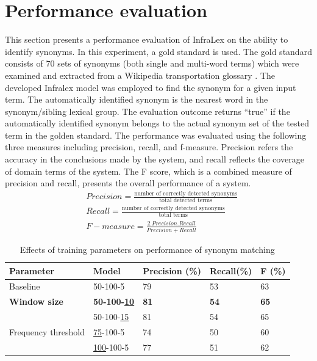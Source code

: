 \documentclass[Journal,InsideFigs, DoubleSpace]{ascelike} %
\begin{document}
{\section{Performance evaluation} \label{sec:eval_infralex}
This section presents a performance evaluation of InfraLex on the ability to identify synonyms. In this experiment, a gold standard  is used. The gold standard consists of 70 sets of synonyms (both single and multi-word terms) which were examined and extracted from a Wikipedia transportation glossary \cite{wikipedia16}. The developed Infralex model was employed to find the synonym for a given input term. The automatically identified synonym is the nearest word in the synonym/sibling lexical group. The evaluation outcome returns ``true'' if the automatically identified synonym belongs to the actual synonym set of the tested term in the golden standard. The performance was evaluated using the following three measures including precision, recall, and f-measure. Precision refers the accuracy in the conclusions made by the system, and recall reflects the coverage of domain terms of the system. The F score, which is a combined measure of precision and recall, presents the overall performance of a system. 
%
\begin{align} 
&Precision = \frac{\text{number of correctly detected synonyms}}{\text{total detected terms}}  \\
&Recall = \frac{\text{number of correctly detected synonyms}}{\text{total terms}}  \\ 
&F-measure = \frac{2.Precision.Recall}{Precision+Recall}
\end{align}
\begin{table} [b] 
	\caption{Effects of training parameters on performance of synonym matching}
	\label{table:eval_syn_par_effect}
	\centering
	\small
	\renewcommand{\arraystretch}{1.25}
	\begin{tabular}{l l l l l }
		\hline
		\hline
		\textbf{Parameter} & \textbf{Model} & \textbf{Precision (\%)}  & \textbf{Recall(\%)} & \textbf{F (\%)}\\
		\hline
		Baseline	&	50-100-5	&79		&53		&63\\
		\hline
		\textbf{Window size}	&\textbf{50-100-\underline{10}}	&\textbf{81}		&\textbf{54}		&\textbf{65}\\
		&50-100-\underline{15}	&81		&54		&65\\
		\hline		
		Frequency threshold	&\underline{75}-100-5	&74		&50		&60\\
		&\underline{100}-100-5	&77		&51		&62\\

\end{tabular}
\end{table}}
\end{document}
